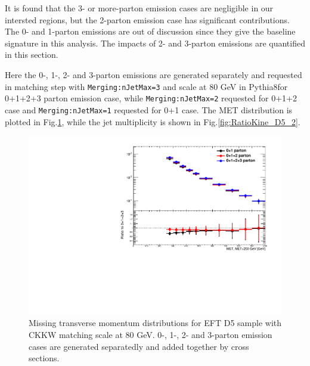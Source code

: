 It is found that the 3- or more-parton emission cases are negligible in our intersted regions, but the 2-parton emission case has significant contributions. The 0- and 1-parton emissions are out of discussion since they give the baseline signature in this analysis. The impacts of 2- and 3-parton emissions are quantified in this section.

Here the 0-, 1-, 2- and 3-parton emissions are generated separately and requested in matching step with \texttt{Merging:nJetMax=3} and scale at 80 GeV in Pythia8for 0+1+2+3 parton emission case, while \texttt{Merging:nJetMax=2} requested for 0+1+2 case and \texttt{Merging:nJetMax=1} requested for 0+1 case. The MET distribution is plotted in Fig.\ref{fig:RatioKine_D5}, while the jet multiplicity is shown in Fig.\ref{fig:RatioKine_D5_2}.

\begin{figure}[h!]
	\centering  
	\includegraphics[width=0.8\linewidth]{figures/monojet_appendix/h_MET_MET250.pdf}
	\caption{Missing transverse momentum distributions for EFT D5 sample with CKKW matching scale at 80 GeV. 0-, 1-, 2- and 3-parton emission cases are generated separatedly and added together by cross sections.}
	\label{fig:RatioKine_D5}
\end{figure}


